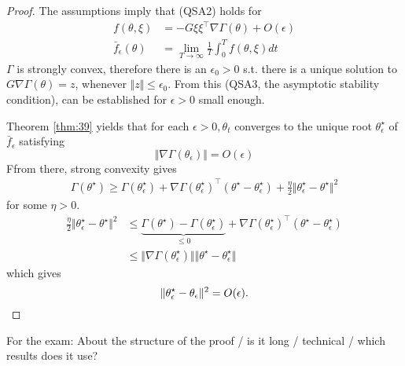 \begin{proof}
    The assumptions imply that (QSA2) holds for 
    \begin{align*}
        f(\theta,\xi)&=-G\xi\xi^\intercal\nabla\Gamma(\theta)+O(\epsilon)\\
        \bar{f}_\epsilon(\theta)&=\lim_{T\to\infty}\frac{1}{T}\int_0^T f(\theta,\xi)dt
    \end{align*} 
    \(\Gamma\) is strongly convex, therefore there is an \(\epsilon_0>0\) s.t.
    there is a unique solution to \(G\nabla\Gamma(\theta)=z\), whenever \(\Vert z\Vert\leq \epsilon_0\).
    From this (QSA3, the asymptotic stability condition), can be established for \(\epsilon>0\) small enough.

    Theorem \ref{thm:39} yields that for each \(\epsilon>0,\theta_t\) converges to the unique root
    \(\theta_\epsilon^\star\) of \(\bar{f}_\epsilon\) satisfying \[\Vert \nabla\Gamma(\theta_\epsilon)\Vert = O(\epsilon)\]
    Ffrom there, strong convexity gives 
    \begin{align*}
        \Gamma(\theta^\star)\geq \Gamma(\theta_\epsilon^\star)+\nabla\Gamma(\theta_\epsilon^\star)^\intercal(\theta^\star-\theta_\epsilon^\star)+\frac{\eta}{2}\Vert \theta_\epsilon^\star-\theta^\star\Vert^2
    \end{align*}
    for some \(\eta>0\).
    \begin{align*}
        \frac{\eta}{2}\Vert \theta_\epsilon^\star-\theta^\star\Vert^2&\leq \underbrace{\Gamma(\theta^\star)-\Gamma(\theta_\epsilon^\star)}_{\leq 0}+\nabla\Gamma(\theta_\epsilon^\star)^\intercal(\theta^\star-\theta_\epsilon^\star)\\
        &\leq \Vert \nabla\Gamma(\theta_\epsilon^\star)\Vert \Vert \theta^\star-\theta_\epsilon^\star\Vert 
    \end{align*}
    which gives \[\Vert \theta_\epsilon^\star-\theta_\epsilon\Vert^2=O(\epsilon).\qedhere\]
\end{proof}

\begin{remark}
    For the exam: About the structure of the proof / is it long / technical / which results does it use?
\end{remark}




